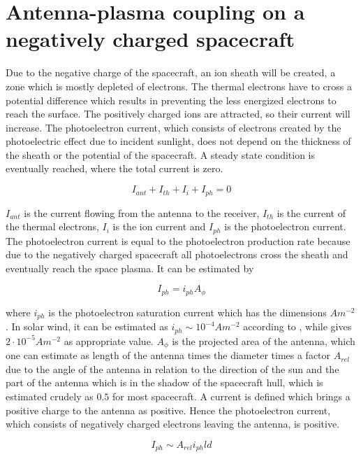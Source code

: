 \documentclass[a4paper,11pt]{thesis}
\begin{document}
\section{Antenna-plasma coupling on a negatively charged spacecraft}
Due to the negative charge of the spacecraft, an ion sheath will be created, a zone which is mostly depleted of electrons. The thermal electrons have to cross a potential difference which results in preventing the less energized electrons to reach the surface. The positively charged ions are attracted, so their current will increase. The photoelectron current, which consists of electrons created by the photoelectric effect due to incident sunlight, does not depend on the thickness of the sheath or the potential of the spacecraft. A steady state condition is eventually reached, where the total current is zero.

\begin{equation}
I_{ant}+I_{th}+I_i+I_{ph}=0
\end{equation}

$I_{ant}$ is the current flowing from the antenna to the receiver, $I_{th}$ is the current of the thermal electrons, $I_i$ is the ion current and $I_{ph}$ is the photoelectron current. The photoelectron current is equal to the photoelectron production rate because due to the negatively charged spacecraft all photoelectrons cross the sheath and eventually reach the space plasma. It can be estimated by

\begin{equation}
I_{ph}=i_{ph}A_\phi
\end{equation}

where $i_{ph}$ is the photoelectron saturation current which has the dimensions $Am^{-2}$. In solar wind, it can be estimated as $i_{ph}\sim 10^{-4} Am^{-2}$ according to \cite{fahleson67}, while  \cite{grard73} gives $2\cdot 10^{-5}Am^{-2}$ as appropriate value. $A_\phi$ is the projected area of the antenna, which one can estimate as length of the antenna times the diameter times a factor $A_{rel}$ due to the angle of the antenna in relation to the direction of the sun and the part of the antenna which is in the shadow of the spacecraft hull, which is estimated crudely as $0.5$ for most spacecraft. A current is defined which brings a positive charge to the antenna as positive. Hence the photoelectron current, which consists of negatively charged electrons leaving the antenna, is positive.

\begin{equation}\label{eq:photo_current}
I_{ph} \sim A_{rel} i_{ph}ld
\end{equation}
\end{document}
